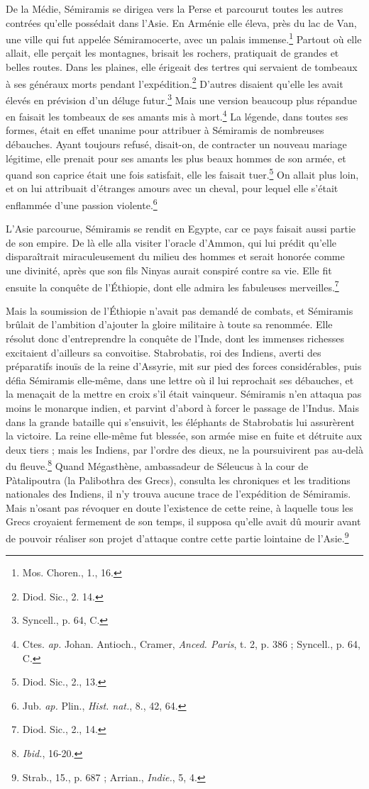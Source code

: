 \documentclass[a4paper, 11pt, oneside, landscape]{article}
\begin{document}
De la Médie, Sémiramis se dirigea vers la Perse et parcourut toutes les autres contrées qu'elle possédait dans l'Asie. En Arménie elle éleva, près du lac de Van, une ville qui fut appelée Sémiramocerte, avec un palais immense.\footnote{Mos. Choren., 1., 16.} Partout où elle allait, elle perçait les montagnes, brisait les rochers, pratiquait de grandes et belles routes. Dans les plaines, elle érigeait des tertres qui servaient de tombeaux à ses généraux morts pendant l'expédition.\footnote{Diod. Sic., 2. 14.} D'autres disaient qu'elle les avait élevés en prévision d'un déluge futur.\footnote{Syncell., p. 64, C.} Mais une version beaucoup plus répandue en faisait les tombeaux de ses amants mis à mort.\footnote{Ctes. \emph{ap.} Johan. Antioch., Cramer, \emph{Anced. Paris}, t. 2, p. 386 ; Syncell., p. 64, C.} La légende, dans toutes ses formes, était en effet unanime pour attribuer à Sémiramis de nombreuses débauches. Ayant toujours refusé, disait-on, de contracter un nouveau mariage légitime, elle prenait pour ses amants les plus beaux hommes de son armée, et quand son caprice était une fois satisfait, elle les faisait tuer.\footnote{Diod. Sic., 2., 13.} On allait plus loin, et on lui attribuait d'étranges amours avec un cheval, pour lequel elle s'était enflammée d'une passion violente.\footnote{Jub. \emph{ap.} Plin., \emph{Hist. nat.}, 8., 42, 64.}

L'Asie parcourue, Sémiramis se rendit en Egypte, car ce pays faisait aussi partie de son empire. De là elle alla visiter l'oracle d'Ammon, qui lui prédit qu'elle disparaîtrait miraculeusement du milieu des hommes et serait honorée comme une divinité, après que son fils Ninyas aurait conspiré contre sa vie. Elle fit ensuite la conquête de l'Éthiopie, dont elle admira les fabuleuses merveilles.\footnote{Diod. Sic., 2., 14.}

Mais la soumission de l'Éthiopie n'avait pas demandé de combats, et Sémiramis brûlait de l'ambition d'ajouter la gloire militaire à toute sa renommée. Elle résolut donc d'entreprendre la conquête de l'Inde, dont les immenses richesses excitaient d'ailleurs sa convoitise. Stabrobatis, roi des Indiens, averti des préparatifs inouïs de la reine d'Assyrie, mit sur pied des forces considérables, puis défia Sémiramis elle-même, dans une lettre où il lui reprochait ses débauches, et la menaçait de la mettre en croix s'il était vainqueur. Sémiramis n'en attaqua pas moins le monarque indien, et parvint d'abord à forcer le passage de l'Indus. Mais dans la grande bataille qui s'ensuivit, les éléphants de Stabrobatis lui assurèrent la victoire. La reine elle-même fut blessée, son armée mise en fuite et détruite aux deux tiers ; mais les Indiens, par l'ordre des dieux, ne la poursuivirent pas au-delà du fleuve.\footnote{\emph{Ibid.}, 16-20.} Quand Mégasthène, ambassadeur de Séleucus à la cour de Pàtalipoutra (la Palibothra des Grecs), consulta les chroniques et les traditions nationales des Indiens, il n'y trouva aucune trace de l'expédition de Sémiramis. Mais n'osant pas révoquer en doute l'existence de cette reine, à laquelle tous les Grecs croyaient fermement de son temps, il supposa qu'elle avait dû mourir avant de pouvoir réaliser son projet d'attaque contre cette partie lointaine de l'Asie.\footnote{Strab., 15., p. 687 ; Arrian., \emph{Indie.}, 5, 4.}
\end{document}
